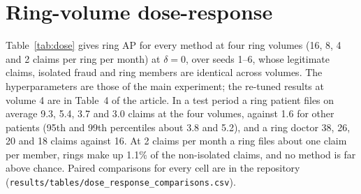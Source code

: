 \documentclass[pdflatex,sn-vancouver-num]{sn-jnl}
\newcommand{\MainTabLowVolume}{4}
\begin{document}
\section{Ring-volume dose-response}\label{sec:s_dose}
Table~\ref{tab:dose} gives ring AP for every method at four ring volumes (16, 8, 4 and 2 claims per ring
per month) at $\delta=0$, over seeds 1--6, whose legitimate claims, isolated fraud and ring members are
identical across volumes. The hyperparameters are those of the main experiment; the re-tuned results at
volume 4 are in Table~\MainTabLowVolume{} of the article. In a test period a ring patient files on average 9.3, 5.4, 3.7 and
3.0 claims at the four volumes, against 1.6 for other patients (95th and 99th percentiles about 3.8 and
5.2), and a ring doctor 38, 26, 20 and 18 claims against 16. At 2 claims per month a ring files about one
claim per member, rings make up 1.1\% of the non-isolated claims, and no method is far above chance. Paired
comparisons for every cell are in the repository (\texttt{results/tables/dose\_response\_comparisons.csv}).
\end{document}
